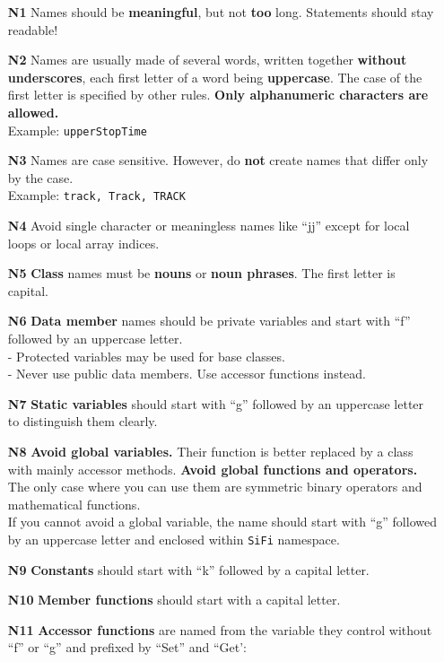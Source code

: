 \documentclass[a4paper,10pt]{article}
\begin{document}
\begin{itemize}
\item[\bf N1] Names should be {\bf meaningful}, but not {\bf too} long.
  Statements should stay readable!
\item[\bf N2] Names are usually made of several words, written together
  {\bf without underscores}, each first letter of a word being {\bf uppercase}.
  The case of the first letter is specified by other rules. {\bf Only
  alphanumeric characters are allowed.}\\
  Example: {\tt upperStopTime}
\item[\bf N3] Names are case sensitive. However, do {\bf not} create names
  that differ only by the case.\\
  Example: {\tt track, Track, TRACK}
\item[\bf N4] Avoid single character or meaningless names like ``jj'' except
  for local loops or local array indices.
\item[\bf N5] {\bf Class} names must be {\bf nouns} or {\bf noun phrases}.
  The first letter is capital.
\item[\bf N6] {\bf Data member} names should be private variables and start
  with ``f'' followed by an uppercase letter.\\
  - Protected variables may be used for base classes.\\
  - Never use public data members. Use accessor functions instead.
\item[\bf N7] {\bf Static variables} should start with ``g'' followed by
  an uppercase letter to distinguish them clearly.
\item[\bf N8] {\bf Avoid global variables.} Their function is better
  replaced by a class with mainly accessor methods. {\bf Avoid global
  functions and operators.} The only case where you can use them are
  symmetric binary operators and mathematical functions.\\
  If you cannot avoid a global variable, the name should start with ``g''
  followed by an uppercase letter and enclosed within {\tt SiFi} namespace.
\item[\bf N9] {\bf Constants} should start with ``k'' followed by a capital
  letter.
\item[\bf N10] {\bf Member functions} should start with a capital letter.
\item[\bf N11] {\bf Accessor functions} are named from the variable they
  control without ``f'' or ``g'' and prefixed by ``Set'' and ``Get':\\

\end{itemize}
\end{document}
